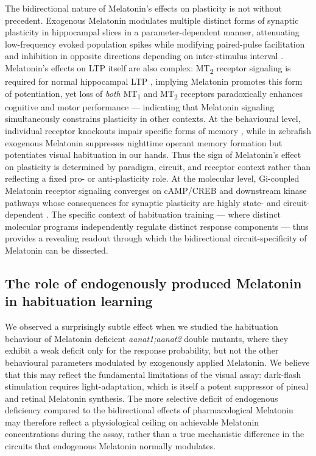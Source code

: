 \documentclass[9.5pt]{RandlettLab_elife}            %
\begin{document}
The bidirectional nature of Melatonin's effects on plasticity is not without precedent.
Exogenous Melatonin modulates multiple distinct forms of synaptic plasticity in hippocampal slices in a parameter-dependent manner, attenuating low-frequency evoked population spikes while modifying paired-pulse facilitation and inhibition in opposite directions depending on inter-stimulus interval \citep{El-Sherif2003-vt}.
Melatonin's effects on LTP itself are also complex: MT\textsubscript{2} receptor signaling is required for normal hippocampal LTP \citep{Larson2006}, implying Melatonin promotes this form of potentiation, yet loss of \emph{both} MT\textsubscript{1} and MT\textsubscript{2} receptors paradoxically enhances cognitive and motor performance \citep{ONealMoffitt2014} — indicating that Melatonin signaling simultaneously constrains plasticity in other contexts.
At the behavioural level, individual receptor knockouts impair specific forms of memory \citep{Pistono2021, Clough2014}, while in zebrafish exogenous Melatonin suppresses nighttime operant memory formation \citep{Rawashdeh2007-bw} but potentiates visual habituation in our hands.
Thus the sign of Melatonin's effect on plasticity is determined by paradigm, circuit, and receptor context rather than reflecting a fixed pro- or anti-plasticity role.
At the molecular level, Gi-coupled Melatonin receptor signaling converges on cAMP/CREB and downstream kinase pathways whose consequences for synaptic plasticity are highly state- and circuit-dependent \citep{ValdsTovar2018, Jilg2019-oy, MalenkaAndBear2004}.
The specific context of habituation training — where distinct molecular programs independently regulate distinct response components — thus provides a revealing readout through which the bidirectional circuit-specificity of Melatonin can be dissected.

\subsection*{The role of endogenously produced Melatonin in habituation learning} 

We observed a surprisingly subtle effect when we studied the habituation behaviour of Melatonin deficient \emph{aanat1;aanat2} double mutants, where they exhibit a weak deficit only for the response probability, but not the other behavioural parameters modulated by exogenously applied Melatonin. 
We believe that this may reflect the fundamental limitations of the visual assay: dark-flash stimulation requires light-adaptation, which is itself a potent suppressor of pineal and retinal Melatonin synthesis.
The more selective deficit of endogenous deficiency compared to the bidirectional effects of pharmacological Melatonin may therefore reflect a physiological ceiling on achievable Melatonin concentrations during the assay, rather than a true mechanistic difference in the circuits that endogenous Melatonin normally modulates.
\end{document}
